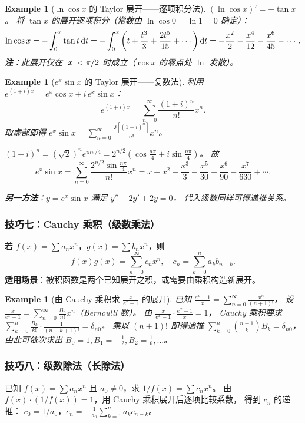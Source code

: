 \documentclass{ctexart}
\newtheorem{example}[theorem]{Example}
\begin{document}
\begin{example}[$\ln\cos x$ 的 Taylor 展开——逐项积分法]
  $(\ln\cos x)' = -\tan x$。
  将 $\tan x$ 的展开逐项积分（常数由 $\ln\cos 0 = \ln 1 = 0$ 确定）：
  \[
    \ln\cos x = -\int_0^x \tan t \,\mathrm{d} t
    = -\int_0^x \left(t + \frac{t^3}{3} + \frac{2t^5}{15} + \cdots\right)\mathrm{d} t
    = -\frac{x^2}{2} - \frac{x^4}{12} - \frac{x^6}{45} - \cdots.
  \]
  \textbf{注}：此展开仅在 $\left| x \right| < \pi/2$ 时成立（$\cos x$ 的零点处 $\ln$ 发散）。
\end{example}

\begin{example}[$e^x\sin x$ 的 Taylor 展开——复数法]
  利用 $e^{(1+i)x} = e^x\cos x + i\,e^x\sin x$：
  \[
    e^{(1+i)x} = \sum_{n=0}^\infty \frac{(1+i)^n}{n!}x^n.
  \]
  取虚部即得 $e^x\sin x = \sum_{n=0}^\infty \frac{\Im[(1+i)^n]}{n!}x^n$。

  $(1+i)^n = (\sqrt{2})^n e^{in\pi/4} = 2^{n/2}(\cos\frac{n\pi}{4} + i\sin\frac{n\pi}{4})$。
  故
  \[
    e^x\sin x = \sum_{n=0}^\infty \frac{2^{n/2}\sin\frac{n\pi}{4}}{n!}x^n
    = x + x^2 + \frac{x^3}{3} - \frac{x^5}{30} - \frac{x^6}{90} - \frac{x^7}{630} + \cdots.
  \]

  \textbf{另一方法}：$y = e^x\sin x$ 满足 $y'' - 2y' + 2y = 0$，
  代入级数同样可得递推关系。
\end{example}

\subsubsection*{技巧七：Cauchy 乘积（级数乘法）}
若 $f(x) = \sum a_n x^n$，$g(x) = \sum b_n x^n$，则
\[
  f(x)g(x) = \sum_{n=0}^\infty c_n x^n, \quad
  c_n = \sum_{k=0}^n a_k b_{n-k}.
\]
\textbf{适用场景}：被积函数是两个已知展开之积，或需要由乘积构造新展开。

\begin{example}[由 Cauchy 乘积求 $\frac{x}{e^x-1}$ 的展开]
  已知 $\frac{e^x-1}{x} = \sum_{n=0}^\infty \frac{x^n}{(n+1)!}$，
  设 $\frac{x}{e^x-1} = \sum_{n=0}^\infty \frac{B_n}{n!}x^n$（Bernoulli 数）。
  由 $\frac{x}{e^x-1}\cdot\frac{e^x-1}{x} = 1$，
  Cauchy 乘积要求
  $\sum_{k=0}^n \frac{B_k}{k!}\cdot\frac{1}{(n-k+1)!} = \delta_{n0}$。
  乘以 $(n+1)!$ 即得递推
  $\sum_{k=0}^n \binom{n+1}{k}B_k = \delta_{n0}$，
  由此可依次求出 $B_0=1, B_1=-\frac{1}{2}, B_2=\frac{1}{6}, \ldots$。
\end{example}

\subsubsection*{技巧八：级数除法（长除法）}
已知 $f(x) = \sum a_n x^n$ 且 $a_0 \ne 0$，求 $1/f(x) = \sum c_n x^n$。
由 $f(x)\cdot(1/f(x)) = 1$，用 Cauchy 乘积展开后逐项比较系数，
得到 $c_n$ 的递推：
$c_0 = 1/a_0$，$c_n = -\frac{1}{a_0}\sum_{k=1}^n a_k c_{n-k}$。
\end{document}
